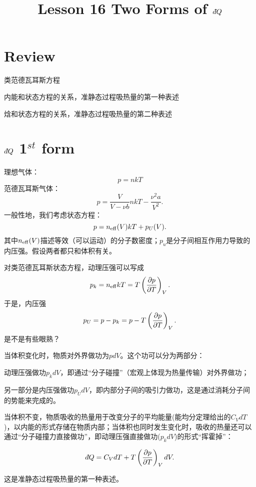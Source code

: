 \documentclass[CJK]{beamer}
\title{Lesson 16 Two Forms of $\dbar Q$}
\author{}
\date{}
\begin{document}

\section{Review}


\begin{frame}
\bchL
\bitem
\item{类范德瓦耳斯方程}
\item{内能和状态方程的关系，准静态过程吸热量的第一种表述}
\item{焓和状态方程的关系，准静态过程吸热量的第二种表述}
\eitem
\echL
\end{frame}

\section{$\dbar Q$ 1$^{st}$ form}
  
\begin{frame}
\bchL
理想气体：
$$ p = nkT $$
范德瓦耳斯气体：
$$ p = \frac{V}{V-\nu b} n kT - \frac{\nu ^2 a}{V^2}.$$
一般性地，我们考虑状态方程：
$$p = n_{\rm eff}(V) kT + p_U(V) .$$
其中$n_{\rm eff}(V)$描述等效（可以运动）的分子数密度；$p_u$是分子间相互作用力导致的内压强。假设两者都只和体积有关。
\echL
\end{frame}


\begin{frame}
\bchL
对类范德瓦耳斯状态方程，动理压强可以写成
$$ p_k = n_{\rm eff}kT = T \left(\frac{\partial p}{\partial T}\right)_{V}. $$
于是，内压强
$$p_U = p-p_k = p - T \left(\frac{\partial p}{\partial T}\right)_{V}. $$
是不是有些眼熟？
\echL
\end{frame}

\begin{frame}
\bchL
当体积变化时，物质对外界做功为$p dV$。这个功可以分为两部分：
\bitem
\item{动理压强做功$p_kdV$，即通过“分子碰撞”（宏观上体现为热量传输）对外界做功；}
\item{另一部分是内压强做功$p_UdV$，即内部分子间的吸引力做功，这是通过消耗分子间的势能来完成的。}
\eitem
\echL
\end{frame}



\begin{frame}
\bchL
当体积不变，物质吸收的热量用于改变分子的平均能量(能均分定理给出的$C_V dT$)，以内能的形式存储在物质内部；当体积也同时发生变化时，吸收的热量还可以通过“分子碰撞力直接做功”，即动理压强直接做功($p_kdV$)的形式“挥霍掉”：

{\blue $$ \dbar Q = C_V dT + T\pfrac pTV dV. $$}

这是{\blue 准静态过程吸热量的第一种表述}。
\echL
\end{frame}
\end{document}
